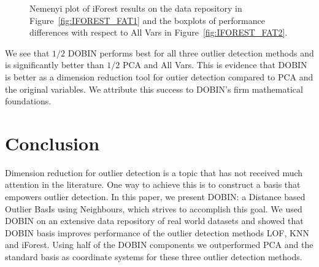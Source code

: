 \documentclass[letter,12pt]{article}
\begin{document}
\begin{figure}[!ht]
	\centering
	\hfill
	\caption{Nemenyi plot of iForest results on the data repository in Figure~\ref{fig:IFOREST_FAT1} and the boxplots of performance differences with respect to All Vars in  Figure~\ref{fig:IFOREST_FAT2}.}
	\label{fig:IFOREST_FAT}
\end{figure}

We see that $1/2$ DOBIN performs best for all three outlier detection methods and is significantly better than $1/2$ PCA and All Vars. This is evidence that DOBIN is better as a dimension reduction tool for outier detection compared to PCA and the original variables. We attribute this success to DOBIN's firm mathematical foundations.

\section{Conclusion}

Dimension reduction for outlier detection is a topic that has not received much attention in the literature. One way to achieve this is to construct a basis that empowers outlier detection. In this paper, we present DOBIN: a Distance based Outlier BasIs using Neighbours, which strives to accomplish this goal. We used DOBIN on an extensive data repository of real world datasets and showed that DOBIN basis improves performance of the outlier detection methods LOF, KNN and iForest. Using half of the DOBIN components we outperformed PCA and the standard basis as coordinate systems for these three outlier detection methods.
\end{document}
